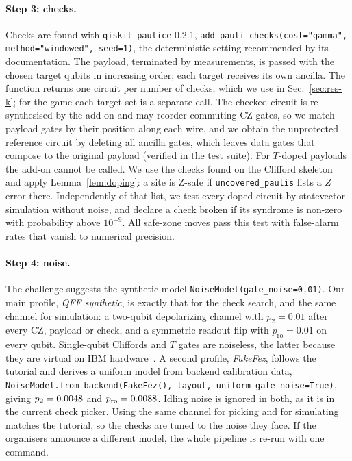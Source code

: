 \paragraph*{Step 3: checks.} Checks are found with \texttt{qiskit-paulice} 0.2.1, \texttt{add\_pauli\_checks(cost="gamma", method="windowed", seed=1)}, the deterministic setting recommended by its documentation. The payload, terminated by measurements, is passed with the chosen target qubits in increasing order; each target receives its own ancilla. The function returns one circuit per number of checks, which we use in Sec.~\ref{sec:res-k}; for the game each target set is a separate call. The checked circuit is re-synthesised by the add-on and may reorder commuting CZ gates, so we match payload gates by their position along each wire, and we obtain the unprotected reference circuit by deleting all ancilla gates, which leaves data gates that compose to the original payload (verified in the test suite). For $T$-doped payloads the add-on cannot be called. We use the checks found on the Clifford skeleton and apply Lemma~\ref{lem:doping}: a site is Z-safe if \texttt{uncovered\_paulis} lists a $Z$ error there. Independently of that list, we test every doped circuit by statevector simulation without noise, and declare a check broken if its syndrome is non-zero with probability above $10^{-9}$. All safe-zone moves pass this test with false-alarm rates that vanish to numerical precision.

\paragraph*{Step 4: noise.} The challenge suggests the synthetic model \texttt{NoiseModel(gate\_noise=0.01)}. Our main profile, \emph{QFF synthetic}, is exactly that for the check search, and the same channel for simulation: a two-qubit depolarizing channel with $p_2=0.01$ after every CZ, payload or check, and a symmetric readout flip with $p_{\mathrm{ro}}=0.01$ on every qubit. Single-qubit Cliffords and $T$ gates are noiseless, the latter because they are virtual on IBM hardware~\cite{mckay2017virtualz}. A second profile, \emph{FakeFez}, follows the tutorial and derives a uniform model from backend calibration data, \texttt{NoiseModel.from\_backend(FakeFez(), layout, uniform\_gate\_noise=True)}, giving $p_2=0.0048$ and $p_{\mathrm{ro}}=0.0088$. Idling noise is ignored in both, as it is in the current check picker. Using the same channel for picking and for simulating matches the tutorial, so the checks are tuned to the noise they face. If the organisers announce a different model, the whole pipeline is re-run with one command.

